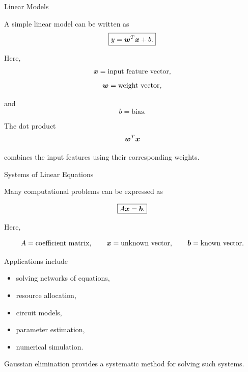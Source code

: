 
\begin{frame}{Linear Models}

A simple linear model can be written as
\vspace{-0.1cm}
\[
\boxed{
y=\bm{w}^{T}\bm{x}+b.
}
\]

Here,
\vspace{-0.1cm}
\[
\bm{x}
=
\text{input feature vector},
\]
\vspace{-0.1cm}
\[
\bm{w}
=
\text{weight vector},
\]

and
\vspace{-0.1cm}
\[
b
=
\text{bias}.
\]

The dot product
\vspace{-0.1cm}
\[
\bm{w}^{T}\bm{x}
\]

combines the input features using their corresponding
weights.

\end{frame}



\begin{frame}{Systems of Linear Equations}

Many computational problems can be expressed as

\[
\boxed{
A\bm{x}=\bm{b}.
}
\]

Here,

\[
A=\text{coefficient matrix},
\qquad
\bm{x}=\text{unknown vector},
\qquad
\bm{b}=\text{known vector}.
\]

Applications include

\begin{itemize}
    \item solving networks of equations,
    \item resource allocation,
    \item circuit models,
    \item parameter estimation,
    \item numerical simulation.
\end{itemize}

Gaussian elimination provides a systematic method
for solving such systems.

\end{frame}


